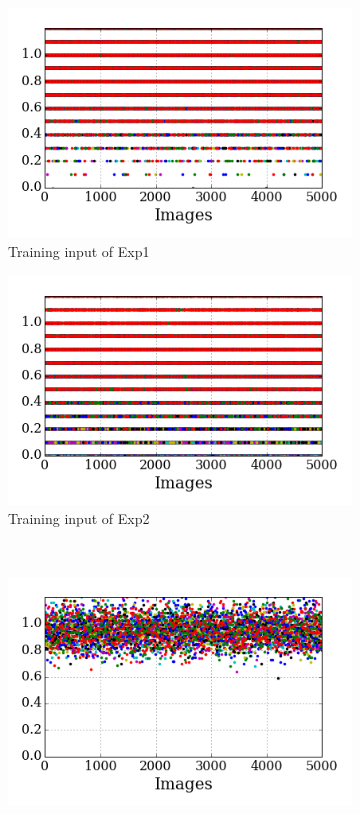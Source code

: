 \begin{figure}
	\centering
	\begin{subfigure}[t]{0.48\textwidth}
		\includegraphics[width=\textwidth]{pics_sdlm/21_exp_AE_noise/exp1_input.png}
		\caption{Training input of Exp1}
	\end{subfigure}
	\begin{subfigure}[t]{0.48\textwidth}
		\includegraphics[width=\textwidth]{pics_sdlm/21_exp_AE_noise/exp2_input.png}
		\caption{Training input of Exp2}
	\end{subfigure}\\
	\begin{subfigure}[t]{0.48\textwidth}
		\includegraphics[width=\textwidth]{pics_sdlm/21_exp_AE_noise/exp1.png}

\end{subfigure}
\end{figure}

